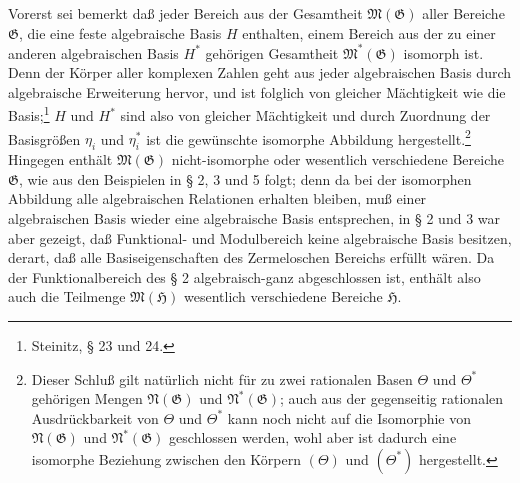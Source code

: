 \documentclass[11pt]{article}
\begin{document}
Vorerst sei bemerkt daß jeder Bereich aus der Gesamtheit
$\mathfrak M(\mathfrak G)$ aller Bereiche $\mathfrak G$, die eine feste
algebraische Basis $H$ enthalten, einem Bereich aus der zu einer anderen
algebraischen Basis $H^*$ gehörigen Gesamtheit $\mathfrak M^*(\mathfrak G)$
isomorph ist. Denn der Körper aller komplexen Zahlen geht aus jeder algebraischen
Basis durch algebraische Erweiterung hervor, und ist folglich von gleicher
Mächtigkeit wie die Basis;\footnote{Steinitz, § 23 und 24.} $H$ und $H^*$ sind
also von gleicher Mächtigkeit und durch Zuordnung der Basisgrößen $\eta_i$ und
$\eta_i^*$ ist die gewünschte isomorphe Abbildung hergestellt.\footnote{Dieser
Schluß gilt natürlich nicht für zu zwei rationalen Basen $\Theta$ und
$\Theta^*$ gehörigen Mengen $\mathfrak N(\mathfrak G)$ und
$\mathfrak N^*(\mathfrak G)$; auch aus der gegenseitig rationalen
Ausdrückbarkeit von $\Theta$ und $\Theta^*$ kann noch nicht auf die Isomorphie
von $\mathfrak N(\mathfrak G)$ und $\mathfrak N^*(\mathfrak G)$ geschlossen
werden, wohl aber ist dadurch eine isomorphe Beziehung zwischen den Körpern
$(\Theta)$ und $(\Theta^*)$ hergestellt.} Hingegen enthält
$\mathfrak M(\mathfrak G)$ nicht-isomorphe oder wesentlich verschiedene Bereiche
$\mathfrak G$, wie aus den Beispielen in § 2, 3 und 5 folgt; denn da bei der
isomorphen Abbildung alle algebraischen Relationen erhalten bleiben, muß einer
algebraischen Basis wieder eine algebraische Basis entsprechen, in § 2 und 3 war
aber gezeigt, daß Funktional- und Modulbereich keine algebraische Basis besitzen,
derart, daß alle Basiseigenschaften des Zermeloschen Bereichs erfüllt wären. Da
der Funktionalbereich des § 2 algebraisch-ganz abgeschlossen ist, enthält also
auch die Teilmenge $\mathfrak M(\mathfrak H)$ wesentlich verschiedene Bereiche
$\mathfrak H$.
\end{document}
